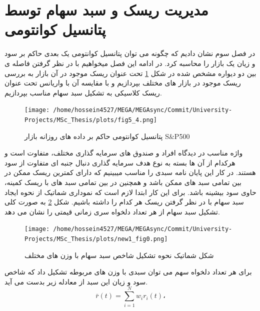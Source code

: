 \documentclass[a4paper,titlepage,12pt,fleqn,oneside]{report}
\begin{document}
\section{مدیریت ریسک و سبد سهام توسط پتانسیل کوانتومی}
در فصل سوم نشان دادیم که چگونه می توان پتانسیل کوانتومی یک بعدی حاکم بر سود و زیان یک بازار را محاسبه کرد. در ادامه این فصل میخواهیم با در نظر گرفتن فاصله ی بین دو دیواره مشخص شده در شکل
\ref{fig:5.3}
تحت عنوان ریسک موجود در آن بازار به بررسی ریسک موجود در بازار های مختلف بپردازیم و با مقایسه آن با واریانس تحت عنوان ریسک کلاسیکی به تشکیل سبد سهام مناسب بپردازیم. 
\begin{figure}[ptb]
	\centering
	\texttt{[image: /home/hossein4527/MEGA/MEGAsync/Commit/University-Projects/MSc\_Thesis/plots/fig5\_4.png]}
	\caption{پتانسیل کوانتومی حاکم بر داده های روزانه بازار S\&P500}
	\label{fig:5.3}
\end{figure}
واژه مناسب در دیدگاه افراد و صندوق های سرمایه گذاری مختلف، متفاوت است و هرکدام از آن ها بسته به نوع هدف سرمایه گذاری دنبال جنبه ای متفاوت از سود هستند. در کار این پایان نامه سبدی را مناسب میبینیم که دارای کمترین ریسک ممکن در بین تمامی سبد های ممکن باشد و همچنین در بین تمامی سبد های با ریسک کمینه، حاوی سود بیشینه باشد.  برای این کار ابتدا لازم است که نموداری شماتیک از نحوه ایجاد سبد سهام با در نظر گرفتن ریسک هر کدام را داشته باشیم.  شکل 
\ref{fig:5.4}
به صورت کلی تشکیل سبد سهام از هر تعداد دلخواه سری زمانی قیمتی را نشان می دهد. 
\begin{figure}[ptb]
	\centering
	\texttt{[image: /home/hossein4527/MEGA/MEGAsync/Commit/University-Projects/MSc\_Thesis/plots/new1\_fig0.png]}
	\caption{شکل شماتیک نحوه تشکیل شاخص سبد سهام با وزن های مختلف}
	\label{fig:5.4}
\end{figure}

برای هر تعداد دلخواه سهم می توان سبدی با وزن های مربوطه تشکیل داد که شاخص سود و زیان این سبد از معادله زیر بدست می آید.
\begin{equation}
\bar{r}(t)=\sum_{i=1}^{N} w _{i}r_{i}(t)،
\label{eq:3}
\end{equation}
  
\end{document}
